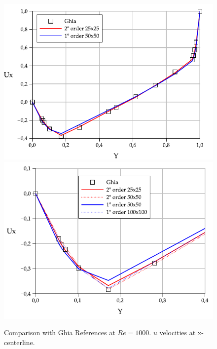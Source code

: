 \documentclass[a4paper,conference]{IEEEtran}
\begin{document}
\begin{figure}[htbp]
  \begin{center}
      \includegraphics[width=.85\linewidth]{images/Re_1000_Ux.pdf}
      \includegraphics[width=.85\linewidth]{images/Re_1000_Ux_zoom.pdf}
  \end{center}
  \caption{\label{fg:Re1000u} Comparison with Ghia References at $Re=1000$. $u$ velocities at x-centerline.}
\end{figure}
\end{document}
